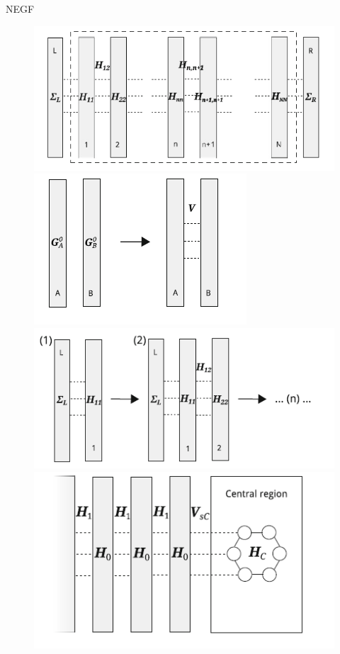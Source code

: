 \documentclass[handout,t]{beamer}
\begin{document}
\begin{frame}{NEGF}
	\begin{figure}
    \centering
    \includegraphics[width=0.45\linewidth]{../figures/iteration.png}
    \includegraphics[width=0.45\linewidth]{../figures/greendyson.png}\\
    \includegraphics[width=0.45\linewidth]{../figures/iterationchannelgreen.png}
    \includegraphics[width=0.45\linewidth]{../figures/leaditerationgreen.png}
    \label{fig:greendyson}
\end{figure}
\end{frame}
\end{document}
